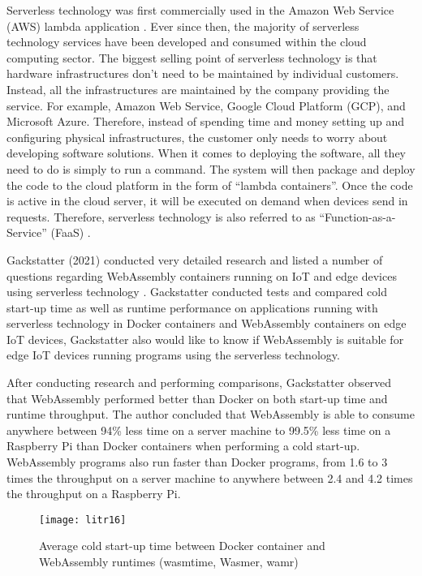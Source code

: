 Serverless technology was first commercially used in the Amazon Web Service (AWS) lambda application \cite{lit30}. Ever since then, the majority of serverless technology services have been developed and consumed within the cloud computing sector. The biggest selling point of serverless technology is that hardware infrastructures don’t need to be maintained by individual customers. Instead, all the infrastructures are maintained by the company providing the service. For example, Amazon Web Service, Google Cloud Platform (GCP), and Microsoft Azure. Therefore, instead of spending time and money setting up and configuring physical infrastructures, the customer only needs to worry about developing software solutions. When it comes to deploying the software, all they need to do is simply to run a command. The system will then package and deploy the code to the cloud platform in the form of “lambda containers”. Once the code is active in the cloud server, it will be executed on demand when devices send in requests. Therefore, serverless technology is also referred to as “Function-as-a-Service” (FaaS) \cite{lit31}.

Gackstatter (2021) conducted very detailed research and listed a number of questions regarding WebAssembly containers running on IoT and edge devices using serverless technology \cite{lit32}. Gackstatter conducted tests and compared cold start-up time as well as runtime performance on applications running with serverless technology in Docker containers and WebAssembly containers on edge IoT devices, Gackstatter also would like to know if WebAssembly is suitable for edge IoT devices running programs using the serverless technology.

After conducting research and performing comparisons, Gackstatter observed that WebAssembly performed better than Docker on both start-up time and runtime throughput. The author concluded that WebAssembly is able to consume anywhere between 94\% less time on a server machine to 99.5\% less time on a Raspberry Pi than Docker containers when performing a cold start-up. WebAssembly programs also run faster than Docker programs, from 1.6 to 3 times the throughput on a server machine to anywhere between 2.4 and 4.2 times the throughput on a Raspberry Pi.

\bigskip
\begin{figure}[hp]
\centering
\texttt{[image: litr16]}
\caption{\footnotesize{Average cold start-up time between Docker container and WebAssembly runtimes (wasmtime, Wasmer, wamr) \cite{lit32}}}
\captionsetup{aboveskip=0pt,font=it}
\end{figure}
\bigskip

